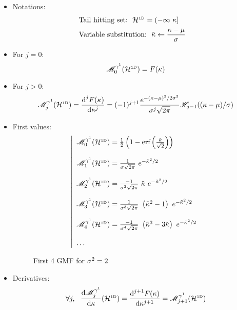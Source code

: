 \documentclass[a4paper,12pt]{article}
\begin{document}
\begin{itemize}
\item Notations:
  \begin{subequations}
    \begin{flalign}
      & \text{Tail hitting set:} \ \ \mathcal{H}^{\text{\tiny1D}}=(-\infty\ \kappa] & \\
      & \text{Variable substitution:} \ \ \tilde{\kappa} \leftarrow \frac{\kappa-\mu}{\sigma} &
    \end{flalign}
  \end{subequations}
\item For $j=0$:
\begin{equation}
  \mathscr{M}^{\gamma^1}_0(\mathcal{H}^{\text{\tiny1D}})=F(\kappa)
\end{equation}
\item For $j>0$:
\begin{equation}
  \mathscr{M}^{\gamma^1}_j(\mathcal{H}^{\text{\tiny1D}})=\frac{\text{d}^jF(\kappa)}{\text{d}\kappa^j}=(-1)^{j+1}\frac{e^{-(\kappa-\mu)^2/2\sigma^2}}{\sigma^j\sqrt{2\pi}}\mathscr{H}_{j-1}((\kappa-\mu)/\sigma)
\end{equation}
\item First values:
\begin{equation}
  \left|
  \begin{array}{l}
    \GMFa_0(\HSC) = \frac{1}{2}\left(1-\erf\left(\frac{\clset}{\sqrt{2}}\right)\right) \\ \\
    \GMFa_1(\HSC) = \frac{1}{\std  \sqrt{2\pi}}\ e^{-\clset^2/2} \\ \\
    \GMFa_2(\HSC) = \frac{-1}{\std^2\sqrt{2\pi}}\ \clset \ e^{-\clset^2/2} \\ \\
    \GMFa_3(\HSC) = \frac{1}{\std^3\sqrt{2\pi}}\ \left(\clset^2-1\right) \ e^{-\clset^2/2} \\ \\
    \GMFa_4(\HSC) = \frac{-1}{\std^4\sqrt{2\pi}}\ \left(\clset^3-3\clset\right) \ e^{-\clset^2/2} \\ \\
    \dots
  \end{array}
  \right.
\end{equation}
\begin{figure}[!h]
  \centering
  \subfigure[$\HS=\HSC=\uinf$]{\scalebox{0.5}{}}\hfill
  \subfigure[$\HS=\HSC=\minfu$]{\scalebox{0.5}{}}
  \caption{First 4 GMF for $\sigma^2=2$}
\end{figure}
\item Derivatives:
\begin{equation}
  \forall j, \ \ \frac{\text{d}\GMFa_j}{\text{d}\lset}(\HSC)=\frac{\text{d}^{j+1}\CDP(\lset)}{\text{d}\lset^{j+1}}=\GMFa_{j+1}(\HSC)
\end{equation}
\end{itemize}
\end{document}
